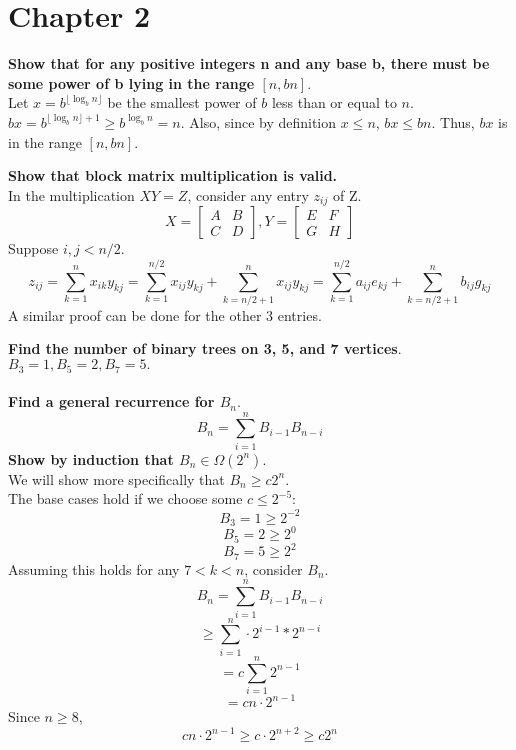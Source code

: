 \section{Chapter 2}

\begin{problem}{2.2}
\textbf{Show that for any positive integers n and any base b, there must be some power of b lying in the range $[n, bn]$}.
\\
Let $x = b^{\lfloor \log_b n \rfloor}$ be the smallest power of $b$ less than or equal to $n$. $bx = b^{\lfloor \log_b n \rfloor + 1} \geq b^{\log_b n} = n$. Also, since by definition $x \leq n$, $bx \leq bn$. Thus, $bx$ is in the range $[n, bn]$.
\end{problem}

\begin{problem}{2.11}
    \textbf{Show that block matrix multiplication is valid.}
    \\
    In the multiplication $XY = Z$, consider any entry $z_{ij}$ of Z.
    \[
        X = 
        \begin{bmatrix}
        A & B \\ C & D
        \end{bmatrix}, 
        Y = 
        \begin{bmatrix}
        E & F \\ G & H
        \end{bmatrix}
    \]
    Suppose $i, j < n / 2$.
    \[
        z_{ij} = \sum_{k = 1}^{n} x_{ik}y_{kj} = \sum_{k = 1}^{n / 2} x_{ij}y_{kj} + \sum_{k = n / 2 + 1}^{n} x_{ij}y_{kj} = \sum_{k = 1}^{n / 2} a_{ij}e_{kj} + \sum_{k = n / 2 + 1}^{n} b_{ij}g_{kj}
    \]
    A similar proof can be done for the other 3 entries.
\end{problem}

\newpage
\begin{problem}{2.13}
    \textbf{Find the number of binary trees on 3, 5, and 7 vertices}. \\
    $B_3 = 1, B_5 = 2, B_7 = 5.$ \\ \\
    \textbf{Find a general recurrence for $B_n$}.
    \[
        B_n = \sum_{i = 1}^{n} B_{i - 1}B_{n - i}
    \]
    \textbf{Show by induction that $B_n \in \Omega(2^n).$} \\
    We will show more specifically that $B_n \geq c 2^{n}$. \\
    The base cases hold if we choose some $c \leq 2^{-5}$:
    \[
        B_3 = 1 \geq 2^{-2}
    \]
    \[
        B_5 = 2 \geq 2^0
    \]
    \[
        B_7 = 5 \geq 2^2
    \]
    Assuming this holds for any $7 < k < n$, consider $B_n.$
    \[
        B_n = \sum_{i = 1}^{n} B_{i - 1}B_{n - i}
    \]
    \[
        \geq \sum_{i = 1}^{n} \cdot 2^{i - 1} * 2^{n - i}
    \]
    \[
        = c \sum_{i = 1}^{n} 2^{n - 1}
    \]
    \[
        = cn \cdot 2^{n - 1}
    \]
    Since $n \geq 8$,
    \[
        cn \cdot 2^{n - 1} \geq c \cdot 2^{n + 2} \geq c2^n
    \]
\end{problem}

